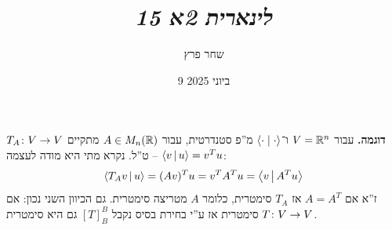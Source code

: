 \documentclass[]{../../../../tex/classes/styledArticle}
\author{שחר פרץ}
\title{\textit{לינארית 2א 15}}
\date{9 ביוני 2025}
\begin{document}
    \maketitle
    \section{}
    
    \textbf{דוגמה. }עבור $V = \mathbb{R}^{n}$ ו־$\left \langle \cdot \mid \cdot \right \rangle $ מ''פ סטנדרטית, עבור $A \in M_n(\mathbb{R})$ מתקיים $T_A \colon V \to V$ ט''ל. נקרא מתי היא מודה לעצמה – $\left \langle v \,\middle|\, u \right \rangle = v^{T}u$: 
    \[ \left \langle T_Av \,\middle|\, u \right \rangle = (Av)^{T}u = v^{T}A^Tu = \left \langle v \,\middle|\, A^{T}u \right \rangle \]
    ז''א אם $A = A^{T}$ אז $T_A$ סימטרית, כלומר $A$ מטריצה סימטרית. גם הכיוון השני נכון: אם $T \colon V \to V$ סימטרית אז ע''י בחירת בסיס נקבל $[T]^{B}_B$ גם היא סימטרית. 
    
\end{document}
